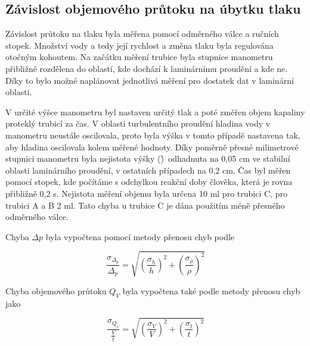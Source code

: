 \subsection{Závislost objemového průtoku na úbytku tlaku}

    Závislost průtoku na tlaku byla měřena pomocí odměrného válce a ručních stopek. Množství vody a tedy její rychlost a změna tlaku byla regulována otočným kohoutem. Na začátku měření trubice byla stupnice manometru přibližně rozdělena do oblastí, kde dochází k laminárnímu proudění a kde ne. Díky to bylo možné naplánovat jednotlivá měření pro dostatek dat v laminární oblasti.

    V určité výšce manometru byl nastaven určitý tlak a poté změřen objem kapaliny proteklý trubicí za čas. V oblasti turbulentního proudění hladina vody v manometru neustále oscilovala, proto byla výška v tomto případě nastavena tak, aby hladina oscilovala kolem měřené hodnoty. Díky poměrně přesné milimetrové stupnici manometru byla nejistota výšky (\h)\ odhadnuta na 0,05 cm ve stabilní oblasti laminárního proudění, v ostatních případech na 0,2 cm. Čas byl měřen pomocí stopek, kde počítáme s odchylkou reakční doby člověka, která je rovna přibližně 0,2 s. Nejistota měření objemu byla určena 10 ml pro trubici C, pro trubici A a B 2 ml. Tato chyba u trubice C je dána použitím méně přesného odměrného válce.
    
    Chyba \(\Delta p\) byla vypočtena pomocí metody přenosu chyb podle

    \begin{equation}
        \frac{\sigma_\Delta_p}{\Delta_p} = \sqrt{(\frac{\sigma_h}{h})^2 + (\frac{\sigma_\rho}{\rho})^2}
    \end{equation}

    Chyba objemového průtoku \(Q_V\) byla vypočtena také podle metody přenosu chyb jako

    \begin{equation}
        \frac{\sigma_Q__V}{\frac{V}{t}} = \sqrt{(\frac{\sigma_V}{V})^2+(\frac{\sigma_t}{t})^2}
    \end{equation}

